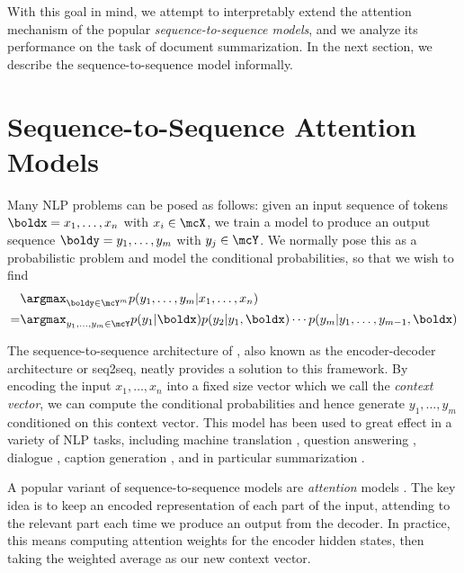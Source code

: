 \documentclass[12pt]{report}
\begin{document}
With this goal in mind, we attempt to interpretably extend the attention mechanism of the popular \emph{sequence-to-sequence models}, and we analyze its performance on the task of document summarization. In the next section, we describe the sequence-to-sequence model informally.





\section{Sequence-to-Sequence Attention Models}

Many NLP problems can be posed as follows: given an input sequence of tokens $\boldx = x_1, \ldots, x_n$ with $x_i \in \mcX$, we train a model to produce an output sequence $\boldy = y_1, \ldots, y_m$ with $y_j \in \mcY$. We normally pose this as a probabilistic problem and model the conditional probabilities, so that we wish to find
\begin{equation}
\begin{split}
&\argmax_{\boldy \in \mcY^m} p(y_1, \ldots, y_m | x_1, \ldots, x_n) \\
= & \argmax_{y_1, \ldots, y_m \in \mcY} p(y_1 | \boldx)p(y_2 | y_1, \boldx) \cdots p(y_m | y_1, \ldots, y_{m-1}, \boldx)
\end{split}
\end{equation}

The sequence-to-sequence architecture of \citet{sutskever2014sequence}, also known as the encoder-decoder architecture or seq2seq, neatly provides a solution to this framework. By encoding the input $x_1, \ldots, x_n$ into a fixed size vector which we call the \emph{context vector}, we can compute the conditional probabilities and hence generate $y_1, \ldots, y_m$ conditioned on this context vector.
This model has been used to great effect in a variety of NLP tasks, including machine translation \citep{sutskever2014sequence, bahdanau2014neural}, question answering \citep{Hermann2015}, dialogue \citep{li2016persona}, caption generation \citep{xu2015captioning}, and in particular summarization \citep{rush2015neural}.


A popular variant of sequence-to-sequence models are \emph{attention} models \citep{bahdanau2014neural}. The key idea is to keep an encoded representation of each part of the input, attending to the relevant part each time we produce an output from the decoder. In practice, this means computing attention weights for the encoder hidden states, then taking the weighted average as our new context vector.
\end{document}
